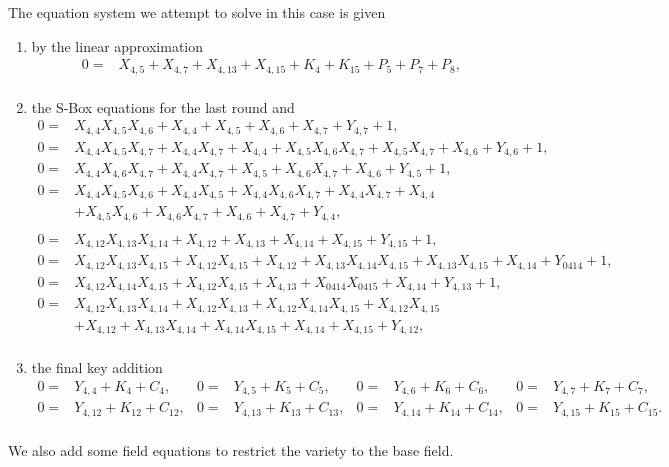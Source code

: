The equation system we attempt to solve in this case is given 
\begin{enumerate} 
 \item by the linear approximation
\begin{align*}
0 =& X_{4,5} + X_{4,7} + X_{4,13} + X_{4,15} + K_{4} + K_{15} + P_5 + P_7 + P_8,\\
\end{align*}
\item the S-Box equations for the last round and
\begin{align*}
0 =& X_{4,4}X_{4,5}X_{4,6} + X_{4,4} + X_{4,5} + X_{4,6} + X_{4,7} + Y_{4,7} + 1, \\
0 =& X_{4,4}X_{4,5}X_{4,7} + X_{4,4}X_{4,7} + X_{4,4} + X_{4,5}X_{4,6}X_{4,7} + X_{4,5}X_{4,7} + X_{4,6} + Y_{4,6} + 1, \\
0 =& X_{4,4}X_{4,6}X_{4,7} + X_{4,4}X_{4,7} + X_{4,5} + X_{4,6}X_{4,7} + X_{4,6} + Y_{4,5} + 1, \\
0 =& X_{4,4}X_{4,5}X_{4,6} + X_{4,4}X_{4,5} + X_{4,4}X_{4,6}X_{4,7} + X_{4,4}X_{4,7} + X_{4,4}  \\
&  + X_{4,5}X_{4,6} + X_{4,6}X_{4,7} + X_{4,6} + X_{4,7} + Y_{4,4}, \\
\\
0 =& X_{4,12}X_{4,13}X_{4,14} + X_{4,12} + X_{4,13} + X_{4,14} + X_{4,15} + Y_{4,15} + 1, \\
0 =& X_{4,12}X_{4,13}X_{4,15} + X_{4,12}X_{4,15} + X_{4,12} + X_{4,13}X_{4,14}X_{4,15} + X_{4,13}X_{4,15} + X_{4,14} + Y_{0414} + 1, \\
0 =& X_{4,12}X_{4,14}X_{4,15} + X_{4,12}X_{4,15} + X_{4,13} + X_{0414}X_{0415} + X_{4,14} + Y_{4,13} + 1, \\
0 =& X_{4,12}X_{4,13}X_{4,14} + X_{4,12}X_{4,13} + X_{4,12}X_{4,14}X_{4,15} + X_{4,12}X_{4,15} \\
& + X_{4,12}  + X_{4,13}X_{4,14} + X_{4,14}X_{4,15} + X_{4,14} + X_{4,15} + Y_{4,12}, \\
\end{align*}
\item the final key addition
\begin{align*}
0 =& Y_{4,4} + K_{4} + C_4, & 0 =& Y_{4,5} + K_{5} + C_5, & 0 =& Y_{4,6} + K_{6} + C_6, & 0 =& Y_{4,7} + K_{7} + C_7,\\
0 =& Y_{4,12} + K_{12} + C_{12}, & 0 =& Y_{4,13} + K_{13} + C_{13}, & 0 =& Y_{4,14} + K_{14} + C_{14}, & 0 =& Y_{4,15} +
K_{15} + C_{15}.\\
\end{align*}
\end{enumerate}
We also add some field equations to restrict the variety to the base field.

